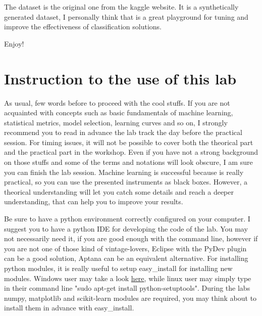\documentclass[aps,letterpaper,10pt]{revtex4}
\begin{document}
The dataset is the original one from the kaggle website. It is a synthetically generated dataset, I personally think that is a great playground for tuning and improve the effectiveness of classification solutions.

Enjoy!

\section{Instruction to the use of this lab}
As usual, few words before to proceed with the cool stuffs. If you are not acquainted with concepts such as basic fundamentals of machine learning, statistical metrics, model selection, learning curves and so on, I strongly recommend you to read in advance the lab track the day before the practical session. For timing issues, it will not be possible to cover both the theorical part and the practical part in the workshop. Even if you have not a strong background on those stuffs and some of the terms and notations will look obscure, I am sure you can finish the lab session. Machine learning is successful because is really practical, so you can use the presented instruments as black boxes. However, a theorical understanding will let you catch some details and reach a deeper understanding, that can help you to improve your results.

Be sure to have a python environment correctly configured on your computer. I suggest you to have a python IDE for developing the code of the lab. You may not necessarily need it, if you are good enough with the command line, however if you are not one of those kind of vintage-lovers, Eclipse with the PyDev plugin can be a good solution, Aptana can be an equivalent alternative.
For installing python modules, it is really useful to setup easy{\_}install for installing new modules. Windows user may take a look \href{http://simpledeveloper.com/how-to-install-easy{\_}install/}{here}, while linux user may simply type in their command line "sudo apt-get install python-setuptools". 
During the labs numpy, matplotlib and scikit-learn modules are required, you may think about to install them in advance with easy{\_}install.
\end{document}
